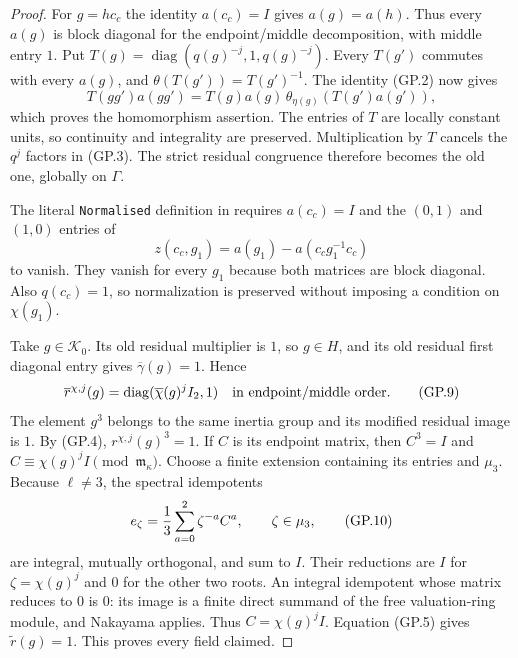\begin{proof}
For $g=hc_c$ the identity $a(c_c)=I$ gives $a(g)=a(h)$.
Thus every $a(g)$ is block diagonal for the endpoint/middle
decomposition, with middle entry $1$.  Put
$T(g)=\operatorname{diag}(q(g)^{-j},1,q(g)^{-j})$.
Every $T(g')$ commutes with every $a(g)$, and
$\theta(T(g'))=T(g')^{-1}$.  The identity (GP.2) now gives
\[
 T(gg')a(gg')
   =T(g)a(g)\,\theta_{\eta(g)}(T(g')a(g')),
                                                               \tag{GP.7}
\]
which proves the homomorphism assertion.  The entries of $T$ are
locally constant units, so continuity and integrality are preserved.
Multiplication by $T$ cancels the $q^j$ factors in (GP.3).
The strict residual congruence therefore becomes the old one,
globally on $\Gamma$.

The literal \texttt{Normalised} definition in
requires $a(c_c)=I$ and the $(0,1)$ and $(1,0)$ entries of
\[
 z(c_c,g_1)=a(g_1)-a(c_cg_1^{-1}c_c)                        \tag{GP.8}
\]
to vanish.  They vanish for every $g_1$ because both matrices
are block diagonal.  Also $q(c_c)=1$, so normalization is
preserved without imposing a condition on $\chi(g_1)$.

Take $g\in\mathcal K_0$.  Its old residual multiplier is $1$,
so $g\in H$, and its old residual first diagonal entry gives
$\overline\gamma(g)=1$.  Hence
\[
 \overline r^{\chi,j}(g)
     =\operatorname{diag}(\overline\chi(g)^j I_2,1)
       \quad\hbox{in endpoint/middle order}.                  \tag{GP.9}
\]
The element $g^3$ belongs to the same inertia group and its
modified residual image is $1$.  By (GP.4),
$r^{\chi,j}(g)^3=1$.  If $C$ is its endpoint matrix, then
$C^3=I$ and $C\equiv\chi(g)^jI\pmod{\mathfrak m_\kappa}$.
Choose a finite extension containing its entries and $\mu_3$.
Because $\ell\ne3$, the spectral idempotents
\[
       e_\zeta={1\over3}\sum_{a=0}^2\zeta^{-a}C^a,
                       \qquad \zeta\in\mu_3,                 \tag{GP.10}
\]
are integral, mutually orthogonal, and sum to $I$.
Their reductions are $I$ for $\zeta=\chi(g)^j$ and $0$
for the other two roots.  An integral idempotent whose matrix
reduces to $0$ is $0$: its image is a finite direct summand
of the free valuation-ring module, and Nakayama applies.
Thus $C=\chi(g)^jI$.  Equation (GP.5) gives
$\widetilde r(g)=1$.  This proves every field claimed.
\end{proof}

